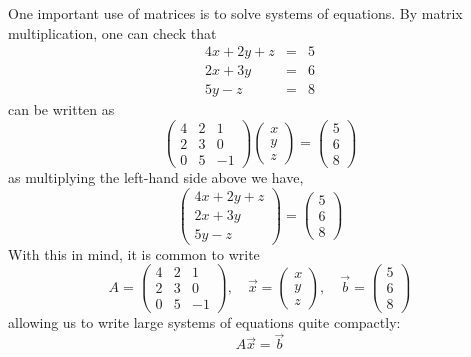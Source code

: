 \documentclass{ximera}
\begin{document}
One important use of matrices is to solve systems of equations. By matrix multiplication, one can check that
\begin{eqnarray*}
4x+2y+z &=& 5\\
2x+3y &=& 6\\
5y -z &=& 8
\end{eqnarray*}
can be written as
\[
\begin{pmatrix}
4 & 2 & 1 \\
2 & 3 & 0\\
0 & 5 & -1
\end{pmatrix}
\begin{pmatrix}
x \\
y\\
z
\end{pmatrix}
= \begin{pmatrix}
5 \\
6\\
8
\end{pmatrix}
\]
as multiplying the left-hand side above we have,
\[
\begin{pmatrix}
4x+2y+z\\
2x+3y\\
5y-z
\end{pmatrix} = \begin{pmatrix}
5\\
6\\
8
\end{pmatrix}
\]
With this in mind, it is common to write
\[
A = \begin{pmatrix}
4 & 2 & 1 \\
2 & 3 & 0\\
0 & 5 & -1
\end{pmatrix},\quad\vec x = \begin{pmatrix} x \\ y \\ z\end{pmatrix},
  \quad\vec b = \begin{pmatrix} 5 \\6\\8\end{pmatrix}
\]
allowing us to write large systems of equations quite compactly:
\[
A\vec{x} = \vec{b}
\]
\end{document}
